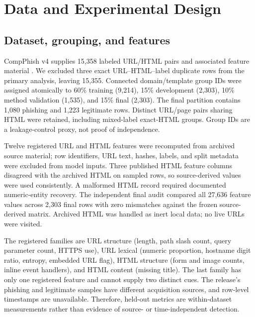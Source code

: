 \documentclass{ieeeaccess}
\begin{document}
\section{Data and Experimental Design}
\subsection{Dataset, grouping, and features}
CompPhish v4 supplies 15,358 labeled URL/HTML pairs and associated feature material \cite{compphishdata,compphishpaper}. We excluded three exact URL--HTML--label duplicate rows from the primary analysis, leaving 15,355. Connected domain/template group IDs were assigned atomically to 60\% training (9,214), 15\% development (2,303), 10\% method validation (1,535), and 15\% final (2,303). The final partition contains 1,080 phishing and 1,223 legitimate rows. Distinct URL/page pairs sharing HTML were retained, including mixed-label exact-HTML groups. Group IDs are a leakage-control proxy, not proof of independence.

Twelve registered URL and HTML features were recomputed from archived source material; row identifiers, URL text, hashes, labels, and split metadata were excluded from model inputs. Three published HTML feature columns disagreed with the archived HTML on sampled rows, so source-derived values were used consistently. A malformed HTML record required documented numeric-entity recovery. The independent final audit compared all 27,636 feature values across 2,303 final rows with zero mismatches against the frozen source-derived matrix. Archived HTML was handled as inert local data; no live URLs were visited.

The registered families are URL structure (length, path slash count, query parameter count, HTTPS use), URL lexical (numeric proportion, hostname digit ratio, entropy, embedded URL flag), HTML structure (form and image counts, inline event handlers), and HTML content (missing title). The last family has only one registered feature and cannot supply two distinct cues. The release's phishing and legitimate samples have different acquisition sources, and row-level timestamps are unavailable. Therefore, held-out metrics are within-dataset measurements rather than evidence of source- or time-independent detection.
\end{document}
